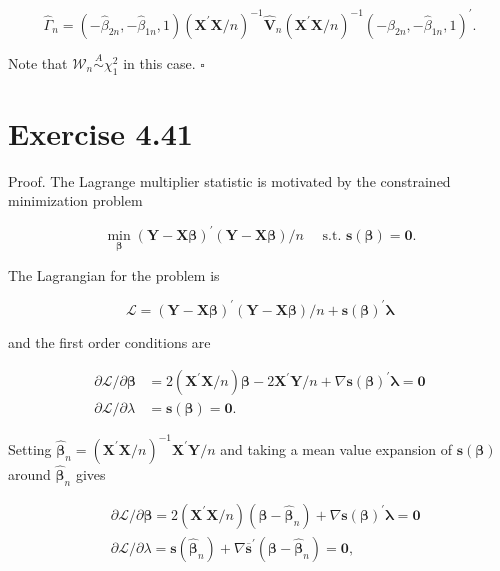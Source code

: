 \documentclass[10pt]{article}
\begin{document}
$$
\hat{\Gamma}_{n}=\left(-\hat{\beta}_{2 n},-\hat{\beta}_{1 n}, 1\right)\left(\mathbf{X}^{\prime} \mathbf{X} / n\right)^{-1} \hat{\mathbf{V}}_{n}\left(\mathbf{X}^{\prime} \mathbf{X} / n\right)^{-1}\left(-\hat{\beta}_{2 n},-\hat{\beta}_{1 n}, 1\right)^{\prime} .
$$

Note that $\mathcal{W}_{n} \stackrel{A}{\sim} \chi_{1}^{2}$ in this case. \(\square\)

\section*{Exercise 4.41}
Proof. The Lagrange multiplier statistic is motivated by the constrained minimization problem

$$
\min _{\boldsymbol{\beta}}(\mathbf{Y}-\mathbf{X} \boldsymbol{\beta})^{\prime}(\mathbf{Y}-\mathbf{X} \boldsymbol{\beta}) / n \quad \text { s.t. } \mathbf{s}(\boldsymbol{\beta})=\mathbf{0} .
$$

The Lagrangian for the problem is

$$
\mathcal{L}=(\mathbf{Y}-\mathbf{X} \boldsymbol{\beta})^{\prime}(\mathbf{Y}-\mathbf{X} \boldsymbol{\beta}) / n+\mathbf{s}(\boldsymbol{\beta})^{\prime} \boldsymbol{\lambda}
$$

and the first order conditions are

$$
\begin{aligned}
\partial \mathcal{L} / \partial \boldsymbol{\beta} & =2\left(\mathbf{X}^{\prime} \mathbf{X} / n\right) \boldsymbol{\beta}-2 \mathbf{X}^{\prime} \mathbf{Y} / n+\nabla \mathbf{s}(\boldsymbol{\beta})^{\prime} \boldsymbol{\lambda}=\mathbf{0} \\
\partial \mathcal{L} / \partial \lambda & =\mathbf{s}(\boldsymbol{\beta})=\mathbf{0} .
\end{aligned}
$$

Setting $\hat{\boldsymbol{\beta}}_{n}=\left(\mathbf{X}^{\prime} \mathbf{X} / n\right)^{-1} \mathbf{X}^{\prime} \mathbf{Y} / n$ and taking a mean value expansion of $\mathbf{s}(\boldsymbol{\beta})$ around $\hat{\boldsymbol{\beta}}_{n}$ gives

$$
\begin{aligned}
& \partial \mathcal{L} / \partial \boldsymbol{\beta}=2\left(\mathbf{X}^{\prime} \mathbf{X} / n\right)\left(\boldsymbol{\beta}-\hat{\boldsymbol{\beta}}_{n}\right)+\nabla \mathbf{s}(\boldsymbol{\beta})^{\prime} \boldsymbol{\lambda}=\mathbf{0} \\
& \partial \mathcal{L} / \partial \lambda=\mathbf{s}\left(\hat{\boldsymbol{\beta}}_{n}\right)+\nabla \overline{\mathbf{s}}^{\prime}\left(\boldsymbol{\beta}-\hat{\boldsymbol{\beta}}_{n}\right)=\mathbf{0},
\end{aligned}
$$
\end{document}
